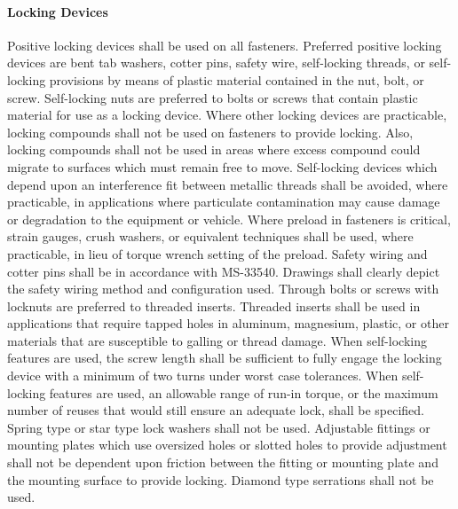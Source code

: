 \documentclass[12pt]{article}
\begin{document}
\paragraph{Locking Devices} %
Positive locking devices shall be used on all fasteners. 
Preferred positive locking devices are bent tab washers, cotter pins, safety wire, self-locking threads, or self-locking provisions by means of plastic material contained in the nut, bolt, or screw. 
Self-locking nuts are preferred to bolts or screws that contain plastic material for use as a locking device. 
Where other locking devices are practicable, locking compounds shall not be used on fasteners to provide locking. 
Also, locking compounds shall not be used in areas where excess compound could migrate to surfaces which must remain free to move. 
Self-locking devices which depend upon an interference fit between metallic threads shall be avoided, where practicable, in applications where particulate contamination may cause damage or degradation to the equipment or vehicle. 
Where preload in fasteners is critical, strain gauges, crush washers, or equivalent techniques shall be used, where practicable, in lieu of torque wrench setting of the preload. 
Safety wiring and cotter pins shall be in accordance with MS-33540. 
Drawings shall clearly depict the safety wiring method and configuration used. 
Through bolts or screws with locknuts are preferred to threaded inserts. 
Threaded inserts shall be used in applications that require tapped holes in aluminum, magnesium, plastic, or other materials that are susceptible to galling or thread damage. 
When self-locking features are used, the screw length shall be sufficient to fully engage the locking device with a minimum of two turns under worst case tolerances. 
When self-locking features are used, an allowable range of run-in torque, or the maximum number of reuses that would still ensure an adequate lock, shall be specified. 
Spring type or star type lock washers shall not be used. 
Adjustable fittings or mounting plates which use oversized holes or slotted holes to provide adjustment shall not be dependent upon friction between the fitting or mounting plate and the mounting surface to provide locking. 
Diamond type serrations shall not be used.
\end{document}
